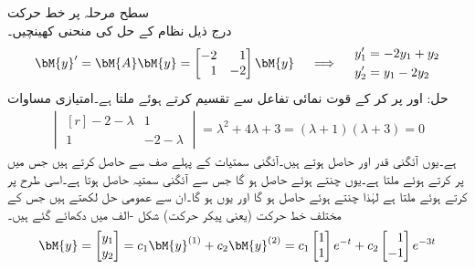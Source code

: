 \quad سطح مرحلہ پر خط حرکت\\
درج ذیل نظام کے حل کی منحنی کھینچیں۔
\begin{gather}\label{مساوات_نظام_خط_حرکت_الف}
\begin{aligned}
\bM{y}'=\bM{A}\bM{y}=\begin{bmatrix*}[r] -2& 1\\ 1&-2 \end{bmatrix*}\bM{y}
\end{aligned}\quad \implies \quad
\begin{aligned}
y_1'&=-2y_1+y_2\\
y_2'&=y_1-2y_2
\end{aligned}
\end{gather}
حل: اور  پر کر کے قوت نمائی تفاعل سے تقسیم کرتے ہوئے  ملتا ہے۔امتیازی مساوات
\begin{align*}
\begin{vmatrix*}[r]
-2-\lambda& 1\\
1& -2-\lambda
\end{vmatrix*}=\lambda^2+4\lambda+3=(\lambda+1)(\lambda+3)=0
\end{align*}
ہے۔یوں آئگنی قدر  اور  حاصل ہوتے ہیں۔آئگنی سمتیات   کے پہلے صف  سے حاصل کرتے ہیں جس میں  پر کرتے ہوئے  ملتا ہے۔یوں  چنتے ہوئے  حاصل ہو گا جس سے آئگنی سمتیہ  حاصل ہوتا ہے۔اسی طرح  پر کرتے ہوئے  ملتا ہے لہٰذا  چنتے ہوئے  حاصل ہو گا اور یوں  ہو گا۔ان سے عمومی حل لکھتے ہیں جس کے مختلف خط حرکت (یعنی پیکر حرکت) شکل -الف میں دکھائے گئے ہیں۔
\begin{align*}
\bM{y}=\begin{bmatrix} y_1 \\y_2 \end{bmatrix}=c_1\bM{y}^{(1)}+c_2\bM{y}^{(2)}=c_1\begin{bmatrix} 1 \\ 1 \end{bmatrix}e^{-t}+c_2\begin{bmatrix*}[r] 1\\ -1 \end{bmatrix*}e^{-3t}
\end{align*}
